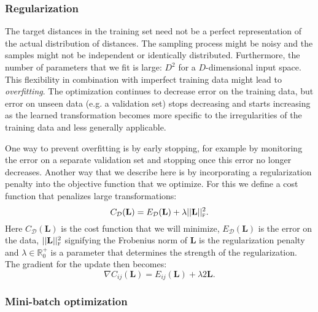 \documentclass[a4paper,titlepage]{article}
\newcommand{\mat}[1]{\mathbf{#1}}
\begin{document}
\subsubsection{Regularization}

The target distances in the training set need not be a perfect representation of the actual distribution of distances. The sampling process might be noisy and the samples might not be independent or identically distributed. Furthermore, the number of parameters that we fit is large: $D^2$ for a $D$-dimensional input space. This flexibility in combination with imperfect training data might lead to \emph{overfitting}. The optimization continues to decrease error on the training data, but error on unseen data (e.g. a validation set) stops decreasing and starts increasing as the learned transformation becomes more specific to the irregularities of the training data and less generally applicable.

One way to prevent overfitting is by early stopping, for example by monitoring the error on a separate validation set and stopping once this error no longer decreases. Another way that we describe here is by incorporating a regularization penalty into the objective function that we optimize. For this we define a cost function that penalizes large transformations:
\begin{equation}
C_{\mathcal{D}}(\mat{L}) =  E_{\mathcal{D}}(\mat{L}) + \lambda ||\mat{L}||_\textsc{f}^2.
\label{eq:structured_risk}
\end{equation}
Here $C_{\mathcal{D}}(\mat{L})$ is the cost function that we will minimize, $E_{\mathcal{D}}(\mat{L})$ is the error on the data, $ ||\mat{L}||_\textsc{f}^2$ signifying the Frobenius norm of $\mat{L}$ is the regularization penalty and $\lambda \in \mathbb{R}_0^+$ is a parameter that determines the strength of the regularization. The gradient for the update then becomes:
\begin{equation}
\nabla C_{ij}(\mat{L}) =  E_{ij}(\mat{L}) + \lambda 2\mat{L}.
\label{eq:structured_grad}
\end{equation}


\subsubsection{Mini-batch optimization}
\end{document}
